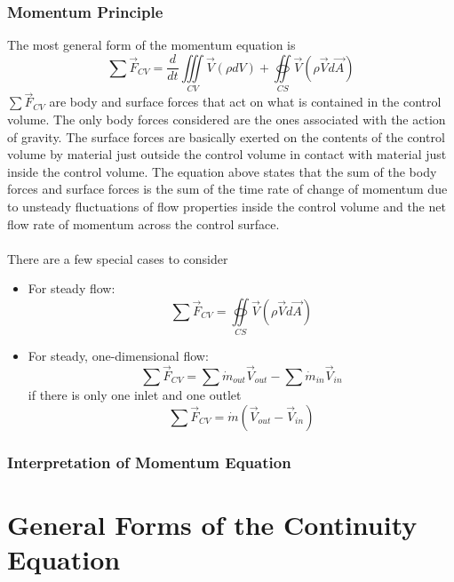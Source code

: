 \documentclass[11pt]{article}
\begin{document}
\subsubsection{Momentum Principle}
The most general form of the momentum equation is 
$$ \sum \vec{F}_{CV} = \frac{d}{dt}\iiint \limits_{CV} \vec{V}(\rho d V) + \oiint \limits_{CS} \vec{V}(\rho \vec{V} d\vec{A})$$
$ \sum \vec{F}_{CV} $ are body and surface forces that act on what is contained in the control volume. The only body forces considered are the ones associated with the action of gravity. The surface forces are basically exerted on the contents of the control volume by material just outside the control volume in contact with material just inside the control volume. The equation above states that the sum of the body forces and surface forces is the sum of the time rate of change of  momentum due to unsteady fluctuations of flow properties inside the control volume and the net flow rate of momentum across the control surface. \\ \\
There are a few special cases to consider
\begin{itemize}
\item For steady flow:
$$ \sum \vec{F}_{CV} = \oiint \limits_{CS} \vec{V}(\rho \vec{V} d\vec{A})$$ 
\item For steady, one-dimensional flow:
$$ \sum \vec{F}_{CV} = \sum \dot{m}_{out}\vec{V}_{out} - \sum \dot{m}_{in}\vec{V}_{in} $$ 
if there is only one inlet and one outlet
$$ \sum \vec{F}_{CV} = \dot{m} (\vec{V}_{out} - \vec{V}_{in})$$
\end{itemize}

\subsubsection{Interpretation of Momentum Equation}

\pagebreak
\section{General Forms of the Continuity Equation}
\end{document}

